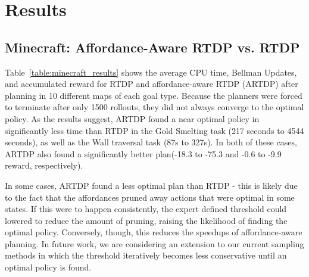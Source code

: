 \documentclass[conference]{IEEEtran}
\begin{document}
\section{Results}
\label{sec:results}
%
\subsection{Minecraft: Affordance-Aware RTDP vs. RTDP}
%
Table~\ref{table:minecraft_results} shows the average CPU time, Bellman Updates, and accumulated reward for RTDP and affordance-aware RTDP (ARTDP) after planning in 10 different maps of each goal type. Because the planners were forced to terminate after only 1500 rollouts, they did not always converge to the optimal policy. As the results suggest, ARTDP found a near optimal policy in significantly less time than RTDP in the Gold Smelting task (217 seconds to 4544 seconds), as well as the Wall traversal task (87s to 327s). In both of these cases, ARTDP also found a significantly better plan(-18.3 to -75.3 and -0.6 to -9.9 reward, respectively).

In some cases, ARTDP found a less optimal plan than RTDP - this is likely due to the fact that the affordances pruned away actions that were optimal in some states. If this were to happen consistently, the expert defined threshold could lowered to reduce the amount of pruning, raising the likelihood of finding the optimal policy. Conversely, though, this reduces the speedups of affordance-aware planning. In future work, we are considering an extension to our current sampling methods in which the threshold iteratively becomes less conservative until an optimal policy is found.

\end{document}
